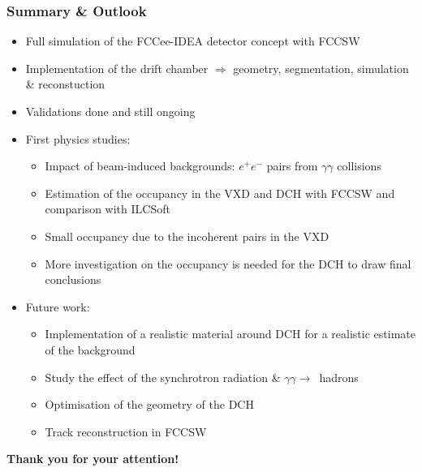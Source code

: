 \documentclass[aspectratio=169, hyperref={colorlinks=true,pdfpagelabels=false,linkcolor=black}, xcolor=dvipsnames,10pt]{beamer}
\begin{document}
\label{lastslide}
\begin{frame}
  \frametitle{Summary \& Outlook}
  
  	\vspace{1cm}
	\begin{itemize}
	\item Full simulation of the FCCee-IDEA detector concept with FCCSW
	\item Implementation of the drift chamber 
		$\Rightarrow$ geometry, segmentation, simulation \& reconstuction
	\item Validations done and still ongoing 
	\item First physics studies:
		\begin{itemize}
		\item Impact of beam-induced backgrounds: $e^{+}e^{-}$ pairs from $\gamma\gamma$ collisions
	  	\item Estimation of the occupancy in the VXD and DCH with FCCSW and comparison with ILCSoft
	  	\item Small occupancy due to the incoherent pairs in the VXD
	  	\item More investigation on the occupancy is needed for the DCH to draw final conclusions
	  	\end{itemize}
	\item Future work:
		\begin{itemize}
		\item Implementation of a realistic material around DCH for a realistic estimate of the background
		\item Study the effect of the synchrotron radiation \& $\gamma\gamma\rightarrow$~hadrons
		\item Optimisation of the geometry of the DCH
		\item Track reconstruction in FCCSW
		\end{itemize}
  	\end{itemize}

	\vspace{1cm}
	\centering
	\Large{\textbf{Thank you for your attention!}}
\end{frame}
\end{document}

